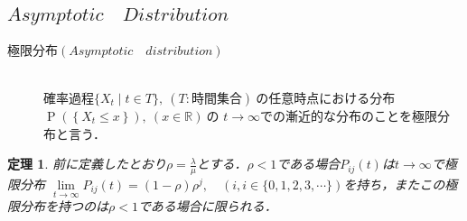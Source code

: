 \documentclass[a4j,papersize,disablejfam,slide,14pt]{jsarticle}
\newtheorem{Prop}{定理}
\def\prob#1{\operatorname{P} \left(\left\{ #1 \right\}\right)} %
\begin{document}
\subsection{$Asymptotic\quad Distribution$}
    \begin{screen}
    	\begin{description}
        	\item[極限分布$(Asymptotic\quad distribution)$]\mbox{}\\
            	確率過程$\{ X_t \mid t \in T \},\ (T:\mbox{時間集合})\ $の任意時点における分布$\prob{X_t \leq x},\ (x \in \mathbb{R})\ $の
                $t \to \infty$での漸近的な分布のことを極限分布と言う．
        \end{description}
    \end{screen}
    \begin{screen}
    	\begin{Prop}
        \label{Prop:asymptotic_dist}
        	前に定義したとおり$\rho=\frac{\lambda}{\mu}$とする．$\rho < 1$である場合$P_{ij}(t)$は$t \to \infty$で極限分布
            $\lim\limits_{t \to \infty} P_{ij}(t) = (1-\rho)\rho^j, \quad (i,i \in \{ 0,1,2,3,\cdots \})$を持ち，またこの極限分布を持つのは$\rho < 1$である場合に限られる．
        \end{Prop}
    \end{screen}
\end{document}
